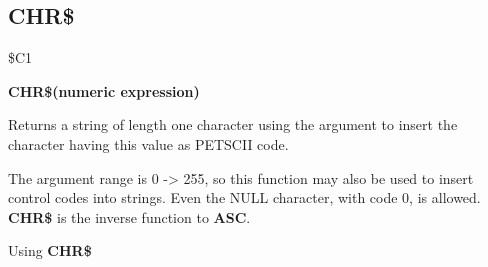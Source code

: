 
\newpage
\subsection{CHR\$}
\begin{description}[leftmargin=3cm,style=nextline]
\item [Token:] \$C1
\item [Format:] {\bf CHR\$(numeric expression)}
\item [Usage:] Returns a string of length one character
               using the argument to insert the character having this
               value as PETSCII code.

\item [Remarks:] The argument range is 0 -> 255, so this function may
                 also be used to insert control codes into strings.
                 Even the NULL character, with code 0, is allowed. \\
               {\bf CHR\$} is the inverse function to {\bf ASC}.
\item [Example:] Using {\bf CHR\$}
\end{description}


\newpage
